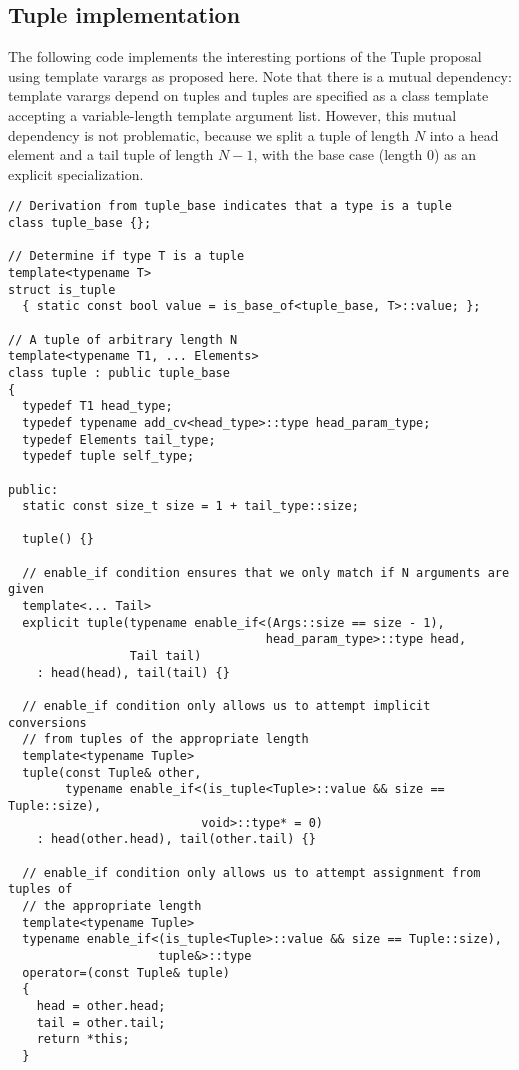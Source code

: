 \documentclass{article}
\begin{document}
\subsection{Tuple implementation}
\label{tupleimpl}
The following code implements the interesting portions of the Tuple
proposal~\cite{Jarvi02} using template varargs as proposed here. Note
that there is a mutual dependency: template varargs depend on tuples
and tuples are specified as a class template accepting a
variable-length template argument list. However,
this mutual dependency is not problematic, because we split a tuple of length $N$ into a head element and a tail tuple of length $N-1$, with the base case (length $0$) as an explicit specialization.

\small
\begin{verbatim}
// Derivation from tuple_base indicates that a type is a tuple
class tuple_base {};

// Determine if type T is a tuple
template<typename T>
struct is_tuple
  { static const bool value = is_base_of<tuple_base, T>::value; };

// A tuple of arbitrary length N
template<typename T1, ... Elements>
class tuple : public tuple_base 
{
  typedef T1 head_type;
  typedef typename add_cv<head_type>::type head_param_type;
  typedef Elements tail_type;
  typedef tuple self_type;

public:
  static const size_t size = 1 + tail_type::size;

  tuple() {}

  // enable_if condition ensures that we only match if N arguments are given
  template<... Tail> 
  explicit tuple(typename enable_if<(Args::size == size - 1),
                                    head_param_type>::type head,
                 Tail tail)
    : head(head), tail(tail) {}

  // enable_if condition only allows us to attempt implicit conversions
  // from tuples of the appropriate length
  template<typename Tuple>
  tuple(const Tuple& other,
        typename enable_if<(is_tuple<Tuple>::value && size == Tuple::size), 
                           void>::type* = 0)
    : head(other.head), tail(other.tail) {}

  // enable_if condition only allows us to attempt assignment from tuples of
  // the appropriate length
  template<typename Tuple>
  typename enable_if<(is_tuple<Tuple>::value && size == Tuple::size),
                     tuple&>::type
  operator=(const Tuple& tuple)
  {
    head = other.head;
    tail = other.tail;
    return *this;
  }


\end{verbatim}
\end{document}

